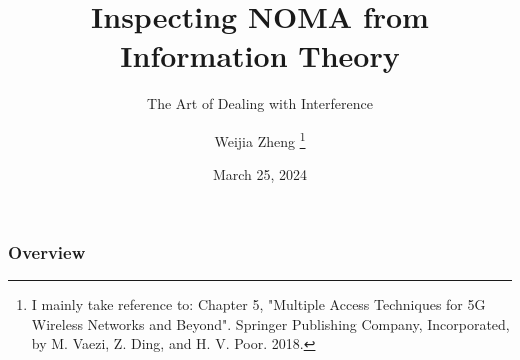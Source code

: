 \documentclass[aspectratio=43, 10pt]{beamer}
\begin{document}
\title{Inspecting NOMA from Information Theory}
\subtitle{The Art of Dealing with Interference}
\author{Weijia Zheng 
\thanks{I mainly take reference to: Chapter 5, "Multiple Access Techniques for 5G Wireless Networks and Beyond". Springer Publishing Company, Incorporated, by M. Vaezi, Z. Ding, and H. V. Poor. 2018.}
}

\date{March 25, 2024}

\setcounter{framenumber}{-1}
\frame{\titlepage}




\begin{frame}
\frametitle{Overview} %
\tableofcontents %
\end{frame}



  
  
\end{document}
